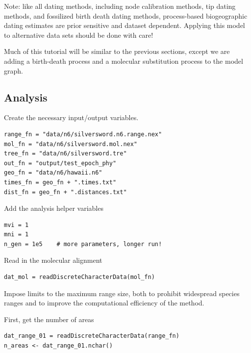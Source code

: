Note: like all dating methods, including node calibration methods, tip dating methods, and fossilized birth death dating methods, process-based biogeographic dating estimates are prior sensitive and dataset dependent.
Applying this model to alternative data sets should be done with care!

Much of this tutorial will be similar to the previous sections, except we are adding a birth-death process and a molecular substitution process to the model graph.

\subsection*{Analysis}

Create the necessary input/output variables.

\begin{snugshade}
\begin{lstlisting}
range_fn = "data/n6/silversword.n6.range.nex"
mol_fn = "data/n6/silversword.mol.nex"
tree_fn = "data/n6/silversword.tre"
out_fn = "output/test_epoch_phy"
geo_fn = "data/n6/hawaii.n6"
times_fn = geo_fn + ".times.txt"
dist_fn = geo_fn + ".distances.txt"
\end{lstlisting}
\end{snugshade}

Add the analysis helper variables

\begin{snugshade}
\begin{lstlisting}
mvi = 1
mni = 1
n_gen = 1e5    # more parameters, longer run!
\end{lstlisting}
\end{snugshade}


Read in the molecular alignment

\begin{snugshade}
\begin{lstlisting}
dat_mol = readDiscreteCharacterData(mol_fn)
\end{lstlisting}
\end{snugshade}


Impose limits to the maximum range size, both to prohibit widespread species ranges and to improve the computational efficiency of the method.

First, get the number of areas
\begin{snugshade}
\begin{lstlisting}
dat_range_01 = readDiscreteCharacterData(range_fn)
n_areas <- dat_range_01.nchar()
\end{lstlisting}
\end{snugshade}

